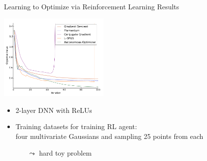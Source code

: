 \begin{frame}[c]{Learning to Optimize via Reinforcement Learning Results }

\centering
\includegraphics[width=0.4\textwidth]{images/l2o_dnn}

\begin{itemize}
\item 2-layer DNN with ReLUs
\item Training datasets for training RL agent:\\ four multivariate Gaussians and sampling 25 points from each
\begin{itemize}
\item[$\leadsto$] hard toy problem
\end{itemize}
\end{itemize}

\end{frame}
